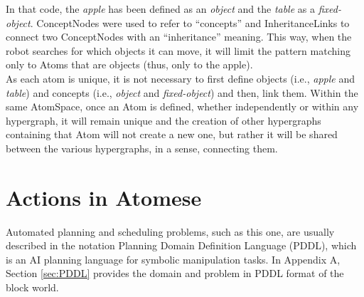 In that code, the \textit{apple} has been defined as an \textit{object} and the \textit{table} as a \textit{fixed-object}. 
ConceptNodes were used to refer to \enquote{concepts} and InheritanceLinks to connect two ConceptNodes with an \enquote{inheritance} meaning. This way, when the robot searches for which objects it can move, it will limit the pattern matching only to Atoms that are objects (thus, only to the apple). \\
As each atom is unique, it is not necessary to first define objects (i.e., \textit{apple} and \textit{table}) and concepts (i.e., \textit{object} and \textit{fixed-object}) and then, link them. Within the same AtomSpace, once an Atom is defined, whether independently or within any hypergraph, it will remain unique and the creation of other hypergraphs containing that Atom will not create a new one, but rather it will be shared between the various hypergraphs, in a sense, connecting them. \\

\section{Actions in Atomese}\label{sec:domain_atomese}


Automated planning and scheduling problems, such as this one, are usually described in the notation Planning Domain Definition Language (PDDL), which is an AI planning language for symbolic manipulation tasks. In Appendix A, Section \ref{sec:PDDL} provides the domain and problem in PDDL format of the block world. 